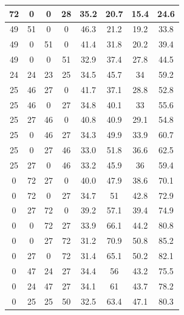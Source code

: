 \documentclass[journal]{IEEEtran}
\begin{document}
\begin{table}[htbp]
\begin{tabular}{|c|c|c|c|c|c|c|c|}
72    & 0    & 0    & 28  & 35.2 & 20.7 & 15.4 & 24.6    \\ \hline
49    & 51   & 0    & 0   & 46.3 & 21.2 & 19.2 & 33.8    \\ \hline
49    & 0    & 51   & 0   & 41.4 & 31.8 & 20.2 & 39.4    \\ \hline
49    & 0    & 0    & 51  & 32.9 & 37.4 & 27.8 & 44.5    \\ \hline
24    & 24   & 23   & 25  & 34.5 & 45.7 & 34   & 59.2    \\ \hline
25    & 46   & 27   & 0   & 41.7 & 37.1 & 28.8 & 52.8    \\ \hline
25    & 46   & 0    & 27  & 34.8 & 40.1 & 33   & 55.6    \\ \hline
25    & 27   & 46   & 0   & 40.8 & 40.9 & 29.1 & 54.8    \\ \hline
25    & 0    & 46   & 27  & 34.3 & 49.9 & 33.9 & 60.7    \\ \hline
25    & 0    & 27   & 46  & 33.0 & 51.8 & 36.6 & 62.5    \\ \hline
25    & 27   & 0    & 46  & 33.2 & 45.9 & 36   & 59.4    \\ \hline
0     & 72   & 27   & 0   & 40.0 & 47.9 & 38.6 & 70.1    \\ \hline
0     & 72   & 0    & 27  & 34.7 & 51   & 42.8 & 72.9    \\ \hline
0     & 27   & 72   & 0   & 39.2 & 57.1 & 39.4 & 74.9    \\ \hline
0     & 0    & 72   & 27  & 33.9 & 66.1 & 44.2 & 80.8    \\ \hline
0     & 0    & 27   & 72  & 31.2 & 70.9 & 50.8 & 85.2    \\ \hline
0     & 27   & 0    & 72  & 31.4 & 65.1 & 50.2 & 82.1    \\ \hline
0     & 47   & 24   & 27  & 34.4 & 56   & 43.2 & 75.5    \\ \hline
0     & 24   & 47   & 27  & 34.1 & 61   & 43.7 & 78.2    \\ \hline
0     & 25   & 25   & 50  & 32.5 & 63.4& 47.1  & 80.3    \\ \hline
\end{tabular}
\end{table}
\end{document}
